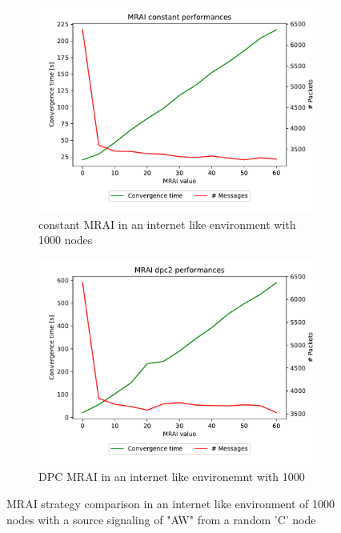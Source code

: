 \documentclass[10pt,conference,letterpaper]{IEEEtran}
\newcommand{\figwidth}{0.78}
\newcommand{\figvspace}{-1.5em}
\begin{document}
\begin{figure}[tb]
	\centering

	\begin{subfigure}{\columnwidth}
		\centering
		\includegraphics[width=\figwidth\columnwidth]{images/internet_like/S_AW/1000_evolution/pareto-internet_like-1000-constant-d8_mrai_evolution.pdf}
		\caption{constant \ac{MRAI} in an internet like environment with \num{1000} nodes}
		\label{fig:s_aw_constant_mrai_1000}
		\qquad
	\end{subfigure}

	\begin{subfigure}{\columnwidth}
		\centering
		\includegraphics[width=\figwidth\columnwidth]{images/internet_like/S_AW/1000_evolution/pareto-internet_like-1000-dpc-d8_mrai_evolution.pdf}
		\caption{\ac{DPC} \ac{MRAI} in an internet like environemnt with \num{1000}}
		\label{fig:s_aw_dpc_mrai_1000}
		\qquad
	\end{subfigure}

	\caption{\ac{MRAI} strategy comparison in an internet like environment of \num{1000} nodes
			 with a source signaling of "AW" from a random 'C' node}
	\label{fig:s_aw_constant-dpc_mrai_1000}
	\vspace{\figvspace}
\end{figure}
\end{document}
